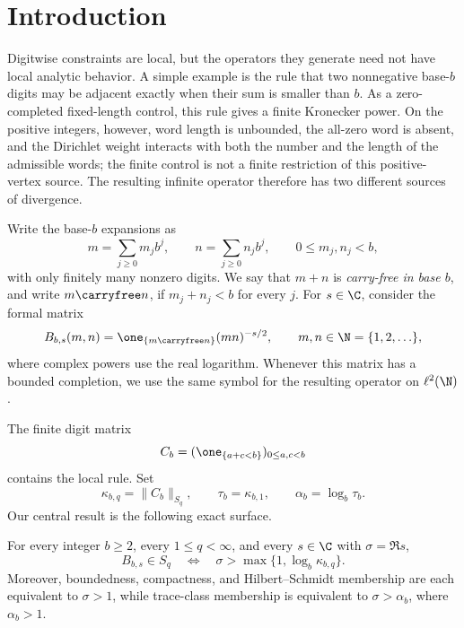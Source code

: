 \section{Introduction}
\label{sec:introduction}

Digitwise constraints are local, but the operators they generate need not
have local analytic behavior.  A simple example is the rule that two
nonnegative base-\(b\) digits may be adjacent exactly when their sum is
smaller than \(b\).  As a zero-completed fixed-length control, this rule
gives a finite Kronecker power.  On the positive integers, however, word length is
unbounded, the all-zero word is absent, and the Dirichlet weight interacts
with both the number and the length of the admissible words; the finite
control is not a finite restriction of this positive-vertex source.  The
resulting infinite operator therefore has two different sources of
divergence.

Write the base-\(b\) expansions as
\[
  m=\sum_{j\ge0}m_jb^j,\qquad
  n=\sum_{j\ge0}n_jb^j,
  \qquad 0\le m_j,n_j<b,
\]
with only finitely many nonzero digits.  We say that \(m+n\) is
\emph{carry-free in base \(b\)}, and write \(m\carryfree n\), if
\(m_j+n_j<b\) for every \(j\).  For \(s\in\C\), consider the formal matrix
\begin{equation}
  B_{b,s}(m,n)
  =\one_{\{m\carryfree n\}}(mn)^{-s/2},
  \qquad m,n\in\N=\{1,2,\ldots\},
  \label{eq:operator-intro}
\end{equation}
where complex powers use the real logarithm.  Whenever this matrix has a
bounded completion, we use the same symbol for the resulting operator on
\(\ell^2(\N)\).

The finite digit matrix
\[
  C_b=(\one_{\{a+c<b\}})_{0\le a,c<b}
\]
contains the local rule.  Set
\[
  \kappa_{b,q}=\|C_b\|_{S_q},
  \qquad
  \tau_b=\kappa_{b,1},
  \qquad
  \alpha_b=\log_b\tau_b.
\]
Our central result is the following exact surface.

\begin{theorem}
\label{thm:main-intro}
For every integer \(b\ge2\), every \(1\le q<\infty\), and every
\(s\in\C\) with \(\sigma=\Re s\),
\begin{equation}
  B_{b,s}\in S_q
  \quad\Longleftrightarrow\quad
  \sigma>\max\{1,\log_b\kappa_{b,q}\}.
  \label{eq:main-surface-intro}
\end{equation}
Moreover, boundedness, compactness, and Hilbert--Schmidt membership are each
equivalent to \(\sigma>1\), while trace-class membership is equivalent to
\(\sigma>\alpha_b\), where \(\alpha_b>1\).
\end{theorem}

